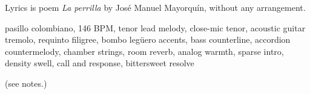 

\begin{notes}
Lyrics is poem \emph{La perrilla} by José Manuel Mayorquín, without any arrangement.
\end{notes}

\begin{style}
pasillo colombiano, 146 BPM, tenor lead melody, close-mic tenor, acoustic guitar tremolo, requinto filigree, bombo legüero accents, bass counterline, accordion countermelody, chamber strings, room reverb, analog warmth, sparse intro, density swell, call and response, bittersweet resolve
\end{style}

\begin{lyrics}
(see notes.)

\end{lyrics}

